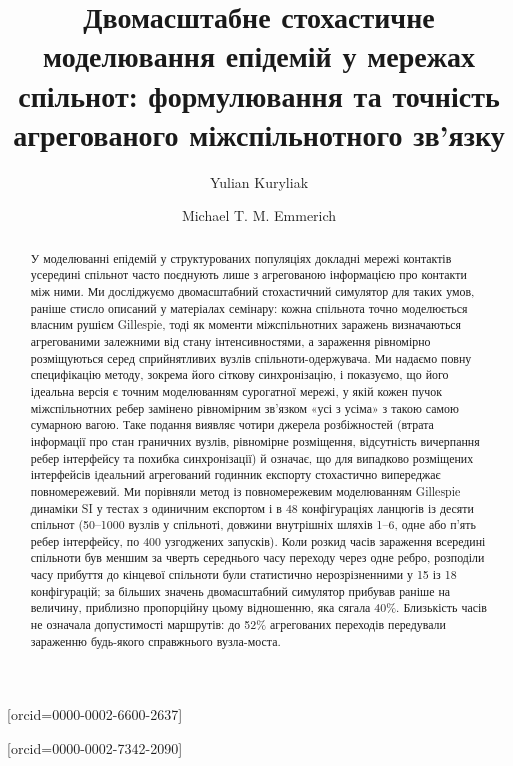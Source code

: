 
\title[mode=title]{Двомасштабне стохастичне моделювання епідемій у мережах спільнот: формулювання та точність агрегованого міжспільнотного зв'язку}

\author[1]{Yulian Kuryliak}[orcid=0000-0002-6600-2637]
\cormark[1]

\author[2]{Michael T. M. Emmerich}[orcid=0000-0002-7342-2090]


\begin{abstract}
У моделюванні епідемій у структурованих популяціях докладні мережі контактів усередині спільнот часто поєднують лише з агрегованою інформацією про контакти між ними. Ми досліджуємо двомасштабний стохастичний симулятор для таких умов, раніше стисло описаний у матеріалах семінару: кожна спільнота точно моделюється власним рушієм Gillespie, тоді як моменти міжспільнотних заражень визначаються агрегованими залежними від стану інтенсивностями, а зараження рівномірно розміщуються серед сприйнятливих вузлів спільноти-одержувача. Ми надаємо повну специфікацію методу, зокрема його сіткову синхронізацію, і показуємо, що його ідеальна версія є точним моделюванням сурогатної мережі, у якій кожен пучок міжспільнотних ребер замінено рівномірним зв'язком «усі з усіма» з такою самою сумарною вагою. Таке подання виявляє чотири джерела розбіжностей (втрата інформації про стан граничних вузлів, рівномірне розміщення, відсутність вичерпання ребер інтерфейсу та похибка синхронізації) й означає, що для випадково розміщених інтерфейсів ідеальний агрегований годинник експорту стохастично випереджає повномережевий. Ми порівняли метод із повномережевим моделюванням Gillespie динаміки SI у тестах з одиничним експортом і в 48 конфігураціях ланцюгів із десяти спільнот (50--1000 вузлів у спільноті, довжини внутрішніх шляхів 1--6, одне або п'ять ребер інтерфейсу, по 400 узгоджених запусків). Коли розкид часів зараження всередині спільноти був меншим за чверть середнього часу переходу через одне ребро, розподіли часу прибуття до кінцевої спільноти були статистично нерозрізненними у 15 із 18 конфігурацій; за більших значень двомасштабний симулятор прибував раніше на величину, приблизно пропорційну цьому відношенню, яка сягала 40\%. Близькість часів не означала допустимості маршрутів: до 52\% агрегованих переходів передували зараженню будь-якого справжнього вузла-моста.
\end{abstract}

